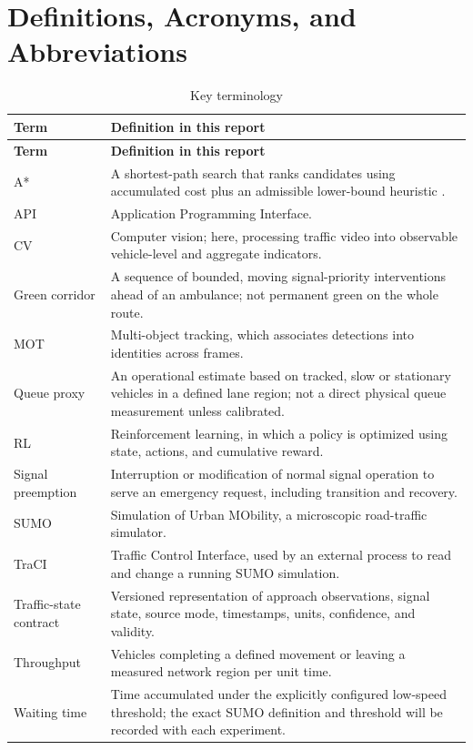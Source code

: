 \section{Definitions, Acronyms, and Abbreviations}

\begin{longtable}{p{}p{}}
\caption{Key terminology}\label{tab:terms}\\
\toprule
\textbf{Term} & \textbf{Definition in this report}\\
\midrule\endfirsthead
\toprule
\textbf{Term} & \textbf{Definition in this report}\\
\midrule\endhead
A* & A shortest-path search that ranks candidates using accumulated cost plus an admissible lower-bound heuristic \cite{hart1968astar}.\\
API & Application Programming Interface.\\
CV & Computer vision; here, processing traffic video into observable vehicle-level and aggregate indicators.\\
Green corridor & A sequence of bounded, moving signal-priority interventions ahead of an ambulance; not permanent green on the whole route.\\
MOT & Multi-object tracking, which associates detections into identities across frames.\\
Queue proxy & An operational estimate based on tracked, slow or stationary vehicles in a defined lane region; not a direct physical queue measurement unless calibrated.\\
RL & Reinforcement learning, in which a policy is optimized using state, actions, and cumulative reward.\\
Signal preemption & Interruption or modification of normal signal operation to serve an emergency request, including transition and recovery.\\
SUMO & Simulation of Urban MObility, a microscopic road-traffic simulator.\\
TraCI & Traffic Control Interface, used by an external process to read and change a running SUMO simulation.\\
Traffic-state contract & Versioned representation of approach observations, signal state, source mode, timestamps, units, confidence, and validity.\\
Throughput & Vehicles completing a defined movement or leaving a measured network region per unit time.\\
Waiting time & Time accumulated under the explicitly configured low-speed threshold; the exact SUMO definition and threshold will be recorded with each experiment.\\
\bottomrule
\end{longtable}

